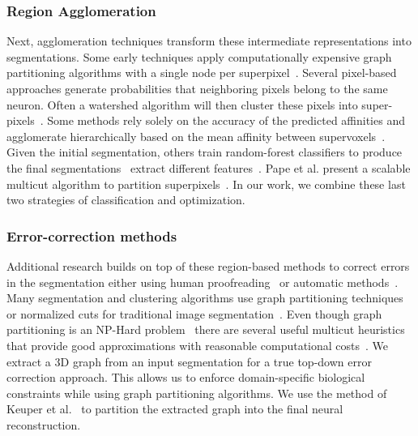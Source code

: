 \subsubsection{Region Agglomeration}
Next, agglomeration techniques transform these intermediate representations into segmentations.
Some early techniques apply computationally expensive graph partitioning algorithms with a single node per superpixel~\cite{andres2012globally}.
Several pixel-based approaches generate probabilities that neighboring pixels belong to the same neuron.
Often a watershed algorithm will then cluster these pixels into super-pixels~\cite{zlateski2015image}.
Some methods rely solely on the accuracy of the predicted affinities and agglomerate hierarchically based on the mean affinity between supervoxels~\cite{lee2017superhuman,funke2017deep}.
Given the initial segmentation, others train random-forest classifiers to produce the final segmentations~\cite{seymour2016rhoananet,nunez2014graph,parag2017anisotropic,zlateski2015image,10.1371/journal.pone.0125825}
extract different features~\cite{bogovic2013learned,jain2011learning}.
Pape et al. present a scalable multicut algorithm to partition superpixels~\cite{beier2017multicut}.
In our work, we combine these last two strategies of classification and optimization.

\subsubsection{Error-correction methods}
Additional research builds on top of these region-based methods to correct errors in the segmentation either using human proofreading~\cite{haehn2014design,haehn2017guided,mojo2} or automatic methods~\cite{rolnick2017morphological,error_correction_using_CNN}.
Many segmentation and clustering algorithms use graph partitioning techniques~\cite{andres2012globally} or normalized cuts for traditional image segmentation~\cite{kappes2016higher,shi2000normalized,tatiraju2008image}.
Even though graph partitioning is an NP-Hard problem~\cite{demaine2006correlation} there are several useful multicut heuristics that provide good approximations with reasonable computational costs~\cite{horvnakova2017analysis}. 
We extract a 3D graph from an input segmentation for a true top-down error correction approach. 
This allows us to enforce domain-specific biological constraints while using graph partitioning algorithms. 
We use the method of Keuper et al.~\cite{keuper2015efficient} to partition the extracted graph into the final neural reconstruction.

